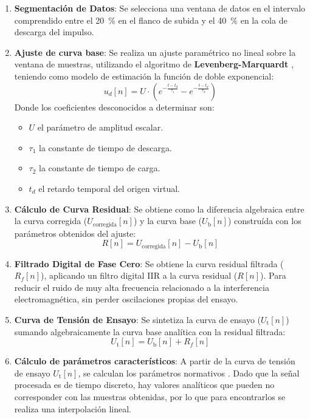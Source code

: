 \begin{enumerate}
    \item \textbf{Segmentación de Datos}: Se selecciona una ventana de datos en el intervalo comprendido entre el \qty{20}{\percent} en el flanco de subida y el \qty{40}{\percent} en la cola de descarga del impulso.
    \item \textbf{Ajuste de curva base}: Se realiza un ajuste paramétrico no lineal sobre la ventana de muestras, utilizando el algoritmo de \textbf{Levenberg-Marquardt} \cite{iec60060_1}, teniendo como modelo de estimación la función de doble exponencial:
\begin{equation}
    \label{eq:modelo_doble_exponencial}
    u_d[n] = U \cdot \left( e^{-\frac{t - t_d}{\tau_1}} - e^{-\frac{t - t_d}{\tau_2}} \right)
\end{equation}
Donde los coeficientes desconocidos a determinar son:
\begin{itemize}
    \item $U$ el parámetro de amplitud escalar.
    \item $\tau_1$ la constante de tiempo de descarga.
    \item $\tau_2$ la constante de tiempo de carga.
    \item $t_d$ el retardo temporal del origen virtual.
\end{itemize}
    \item \textbf{Cálculo de Curva Residual}: Se obtiene como la diferencia algebraica entre la curva corregida ($U_{\text{corregida}}[n]$) y la curva base ($U_\text{b}[n]$) construída con los parámetros obtenidos del ajuste:
    \begin{equation}
        \label{eq:curva_residual}
        R[n] = U_{\text{corregida}}[n] - U_\text{b}[n]
    \end{equation}
    \item \textbf{Filtrado Digital de Fase Cero}: 
    Se obtiene la curva residual filtrada ($R_f[n]$), aplicando un filtro digital IIR a la curva residual ($R[n]$). Para reducir el ruido de muy alta frecuencia relacionado a la interferencia electromagnética, sin perder oscilaciones propias del ensayo.
    \item \textbf{Curva de Tensión de Ensayo}: Se sintetiza la curva de ensayo ($U_\text{t}[n]$) sumando algebraicamente la curva base analítica con la residual filtrada:
    \begin{equation}
        \label{eq:curva_ensayo}
        U_\text{t}[n] = U_\text{b}[n] + R_f[n]
    \end{equation}
    \item \textbf{Cálculo de parámetros característicos}: A partir de la curva de tensión de ensayo $U_\text{t}[n]$, se calculan los parámetros normativos \cite{iec60060_1}. Dado que la señal procesada es de tiempo discreto, hay valores analíticos que pueden no corresponder con las muestras obtenidas, por lo que para encontrarlos se realiza una interpolación lineal.

\end{enumerate}
